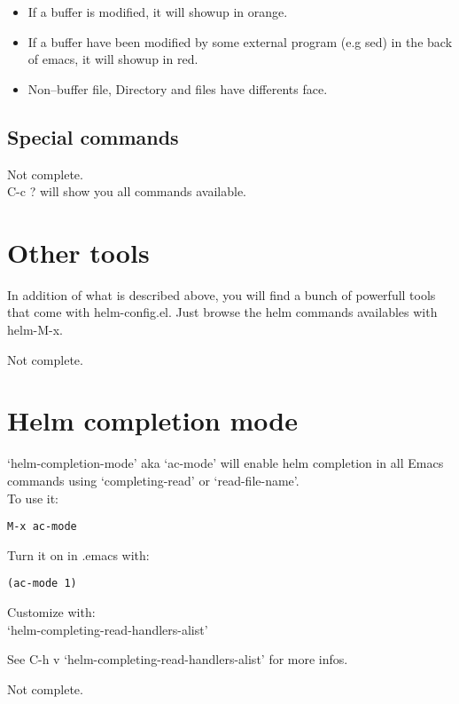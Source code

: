 \documentclass[a4paper,11pt]{article}
\begin{document}
\begin{itemize}
\item If a buffer is modified, it will showup in orange.
\end{itemize}
\begin{itemize}
\item If a buffer have been modified by some external program (e.g sed) in the back of emacs, it will showup in red.  
\end{itemize}
\begin{itemize}
\item Non--buffer file, Directory and files have differents face.
\end{itemize}

\subsection{Special commands}
\label{sec:special-commands}
Not complete.\\

C-c ? will show you all commands available.


\section{Other tools}
\label{sec:other-tools}

In addition of what is described above, you will find a bunch of powerfull tools that come with helm-config.el.
Just browse the helm commands availables with helm-M-x.

Not complete.

\section{Helm completion mode}
\label{sec:anyth-compl-mode}
`helm-completion-mode' aka `ac-mode' will enable helm completion in all 
Emacs commands using `completing-read' or `read-file-name'.\\
To use it:
\begin{verbatim}
M-x ac-mode
\end{verbatim}
Turn it on in .emacs with:
\begin{verbatim}
(ac-mode 1)
\end{verbatim}
Customize with:\\
`helm-completing-read-handlers-alist'

See C-h v `helm-completing-read-handlers-alist' for more infos.

Not complete.
\end{document}
